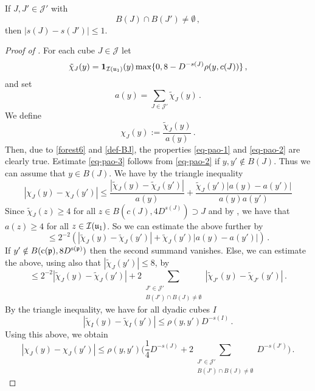     \begin{lemma}
        \label{moderate-scale-change}
        \leanok

        If $J, J' \in \mathcal{J'}$ with
        $$
            B(J) \cap B(J') \ne \emptyset\,,
        $$
        then $|s(J) - s(J')| \le 1$.
    \end{lemma}

    \begin{proof}[Proof of ]
        \leanok
        For each cube $J \in \mathcal{J}$ let
        $$
            \tilde\chi_J(y) = \mathbf{1}_{{\mathcal{I}}({\mathfrak u}_1)}(y)\max\{0, 8 - D^{-s(J)} \rho(y, c(J))\}\,,
        $$
        and set
        $$
            a(y) = \sum_{J \in \mathcal{J}'} \tilde \chi_J(y)\,.
        $$
        We define
        \[
            \chi_J(y) := \frac{\tilde \chi_J(y)}{a(y)}\,.
        \]
        Then, due to \eqref{forest6} and \eqref{def-BJ}, the properties \eqref{eq-pao-1} and \eqref{eq-pao-2} are clearly true. Estimate \eqref{eq-pao-3} follows from \eqref{eq-pao-2} if $y, y' \notin B(J)$. Thus we can assume that $y \in B(J)$. We have by the triangle inequality
        $$
            |\chi_J(y) - \chi_J(y')| \le \frac{|\tilde \chi_J(y) - \tilde \chi_J(y')|}{a(y)} + \frac{\tilde \chi_J(y')|a(y) - a(y')|}{a(y)a(y')}
        $$
        Since $\tilde \chi_J(z) \ge 4$ for all $z \in B(c(J),4D^{s(J)}) \supset J$ and by , we have that $a(z) \ge 4$ for all $z \in {\mathcal{I}}({\mathfrak u}_1)$. So we can estimate the above further by
        $$
            \le 2^{-2}(|\tilde \chi_J(y) - \tilde \chi_J(y')| + \tilde \chi_J(y')|a(y) - a(y')|)\,.
        $$
        If $y' \notin B({\mathrm{c}}({\mathfrak p}), 8D^{{\mathrm{s}}({\mathfrak p})})$ then the second summand vanishes. Else, we can estimate the above, using also that $|\tilde \chi_J(y')| \le 8$, by
        $$
            \le 2^{-2} |\tilde \chi_J(y) - \tilde \chi_J(y')| + 2 \sum_{\substack{J' \in \mathcal{J}'\\ B(J') \cap B(J) \ne \emptyset}}|\tilde \chi_{J'}(y) - \tilde \chi_{J'} (y')|\,.
        $$
        By the triangle inequality, we have for all dyadic cubes $I$
        $$
            |\tilde \chi_I(y) - \tilde \chi_I(y')| \le \rho(y, y') D^{-s(I)}\,.
        $$
        Using this above, we obtain
        $$
            |\chi_J(y) - \chi_J(y')| \le \rho(y,y') \Big( \frac{1}{4} D^{-s(J)} + 2 \sum_{\substack{J' \in \mathcal{J}'\\ B(J') \cap B(J) \ne \emptyset}} D^{-s(J')}\Big)\,.
$$
\end{proof}
